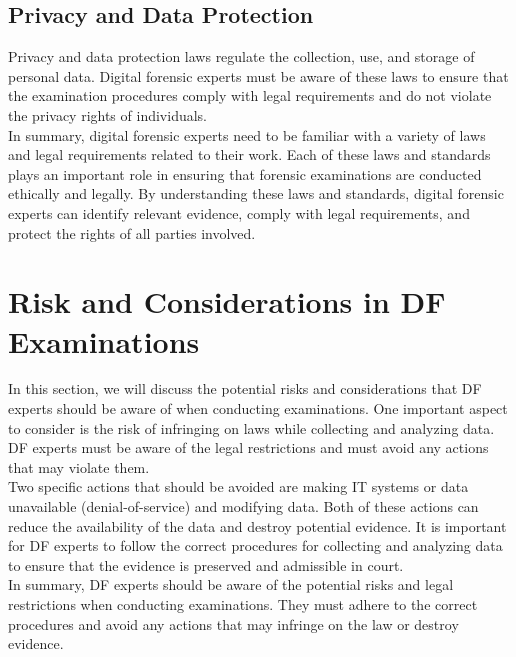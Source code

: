 \documentclass{scrreprt}
\begin{document}
\subsection{Privacy and Data Protection}
Privacy and data protection laws regulate the collection, use, and storage of personal data. Digital forensic experts must be aware of these laws to ensure that the examination procedures comply with legal requirements and do not violate the privacy rights of individuals.
\\\linebreak In summary, digital forensic experts need to be familiar with a variety of laws and legal requirements related to their work. Each of these laws and standards plays an important role in ensuring that forensic examinations are conducted ethically and legally. By understanding these laws and standards, digital forensic experts can identify relevant evidence, comply with legal requirements, and protect the rights of all parties involved.
\section{Risk and Considerations in DF Examinations}
In this section, we will discuss the potential risks and considerations that DF experts should be aware of when conducting examinations. One important aspect to consider is the risk of infringing on laws while collecting and analyzing data. DF experts must be aware of the legal restrictions and must avoid any actions that may violate them.
\\\linebreak Two specific actions that should be avoided are making IT systems or data unavailable (denial-of-service) and modifying data. Both of these actions can reduce the availability of the data and destroy potential evidence. It is important for DF experts to follow the correct procedures for collecting and analyzing data to ensure that the evidence is preserved and admissible in court.
\\\linebreak In summary, DF experts should be aware of the potential risks and legal restrictions when conducting examinations. They must adhere to the correct procedures and avoid any actions that may infringe on the law or destroy evidence.
\end{document}
